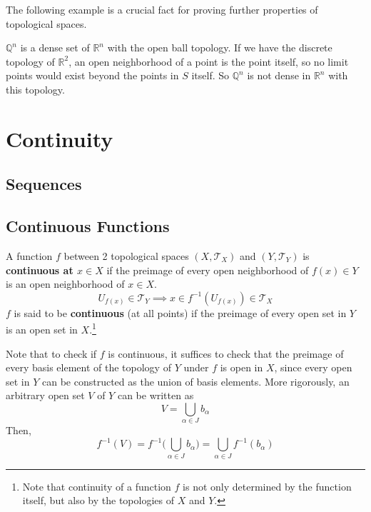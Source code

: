 \documentclass{article}
\begin{document}
    The following example is a crucial fact for proving further properties of topological spaces. 

    \begin{example}
    $\mathbb{Q}^{n}$ is a dense set of $\mathbb{R}^{n}$ with the open ball topology. If we have the discrete topology of $\mathbb{R}^{2}$, an open neighborhood of a point is the point itself, so no limit points would exist beyond the points in $S$ itself. So $\mathbb{Q}^{n}$ is not dense in $\mathbb{R}^{n}$ with this topology. 
    \end{example}

\section{Continuity} 

  \subsection{Sequences}

  \subsection{Continuous Functions}

    \begin{definition}
      A function $f$ between 2 topological spaces $(X, \mathscr{T}_{X})$ and $(Y, \mathscr{T}_{Y})$ is \textbf{continuous at $x \in X$} if the preimage of every open neighborhood of $f(x) \in Y$ is an open neighborhood of $x \in X$.
      \begin{equation}
        U_{f(x)} \in \mathscr{T}_{Y} \implies x \in f^{-1}(U_{f(x)}) \in \mathscr{T}_{X}
      \end{equation} 
      $f$ is said to be \textbf{continuous} (at all points) if the preimage of every open set in $Y$ is an open set in $X$.\footnote{Note that continuity of a function $f$ is not only determined by the function itself, but also by the topologies of $X$ and $Y$.}
    \end{definition}

    Note that to check if $f$ is continuous, it suffices to check that the preimage of every basis element of the topology of $Y$ under $f$ is open in $X$, since every open set in $Y$ can be constructed as the union of basis elements. More rigorously, an arbitrary open set $V$ of $Y$ can be written as 
    \begin{equation}
      V = \bigcup_{\alpha \in J} b_\alpha
    \end{equation}
    Then, 
    \begin{equation}
      f^{-1} (V) = f^{-1} \Big( \bigcup_{\alpha \in J} b_\alpha \Big) = \bigcup_{\alpha \in J} f^{-1} (b_\alpha)
    \end{equation}
\end{document}
